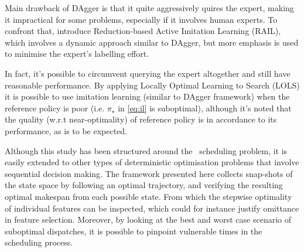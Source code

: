 \documentclass[smallextended]{svjour3}
\begin{document}
Main drawback of DAgger is that it quite aggressively quires the expert, making 
it impractical for some problems, especially if it involves human experts. 
To confront that, \cite{Judah12} introduce Reduction-based Active Imitation 
Learning (RAIL), which involves a dynamic approach similar to DAgger, but more 
emphasis is used to minimise the expert's labelling effort.

In fact, it's possible to circumvent querying the expert altogether and still 
have reasonable performance. By applying Locally Optimal Learning to Search 
(LOLS) \cite{ChangKADL15} it is possible to use imitation learning (similar to 
DAgger framework) when the reference policy is poor (i.e. $\pi_\star$ in 
\cref{eq:il} is suboptimal), 
although it's noted that the quality (w.r.t near-optimality) of reference 
policy is in accordance to its performance, as is to be expected. 



















Although this study has been structured around the \jsp\ scheduling problem, 
it is easily extended to other types of deterministic optimisation problems 
that involve sequential decision making. 
The framework presented here collects snap-shots of the state space by 
following an optimal trajectory, and verifying the resulting optimal makespan 
from each possible state. 
From which the stepwise optimality of individual features can be inspected, 
which could for instance justify omittance in feature selection. 
Moreover, by looking at the best and worst case scenario of suboptimal 
dispatches, it is possible to pinpoint vulnerable times in the scheduling 
process. 

 
  
\end{document}
